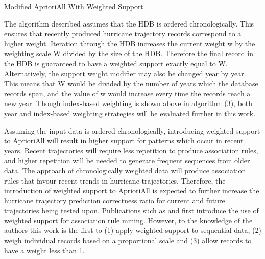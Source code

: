 \documentclass[12pt,conference]{IEEEtran}
\begin{document}
\begin{algorithm}[H]
  \caption{Modified AprioriAll With Weighted Support}
  \label{aprioriall_for_hurricanes}
  \begin{algorithmic}[1]
    \EndFor
  \EndFor
  \end{algorithmic}
\end{algorithm}

The algorithm described assumes that the HDB is ordered chronologically. This ensures that recently produced hurricane trajectory records correspond to a higher weight. Iteration through the HDB increases the current weight w by the weighting scale W divided by the size of the HDB. Therefore the final record in the HDB is guaranteed to have a weighted support exactly equal to W. Alternatively, the support weight modifier may also be changed year by year. This means that W would be divided by the number of years which the database records span, and the value of w would increase every time the records reach a new year. Though index-based weighting is shown above in algorithm (3), both year and index-based weighting strategies will be evaluated further in this work.

Assuming the input data is ordered chronologically, introducing weighted support to AprioriAll will result in higher support for patterns which occur in recent years. Recent trajectories will require less repetition to produce association rules, and higher repetition will be needed to generate frequent sequences from older data. The approach of chronologically weighted data will produce association rules that favour recent trends in hurricane trajectories. Therefore, the introduction of weighted support to AprioriAll is expected to further increase the hurricane trajectory prediction correctness ratio for current and future trajectories being tested upon. Publications such as \cite{war-mining} and \cite{cai-weighted-thesis} first introduce the use of weighted support for association rule mining. However, to the knowledge of the authors this work is the first to (1) apply weighted support to sequential data, (2) weigh individual records based on a proportional scale and (3) allow records to have a weight less than 1.
\end{document}
